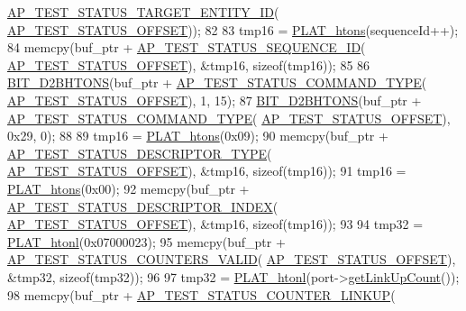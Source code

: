 \begin{DoxyCode}
      \hyperlink{avbap__message_8hpp_a8f4212cffc6a9c484b6b90704ddba6cb}{AP\_TEST\_STATUS\_TARGET\_ENTITY\_ID}(
      \hyperlink{avbap__message_8hpp_a098685900cab07ec2886722ea6b6b85e}{AP\_TEST\_STATUS\_OFFSET}));
82 
83     tmp16 = \hyperlink{linux_2src_2platform_8cpp_aa89fc0aa7465274c200da69771d2a043}{PLAT\_htons}(sequenceId++);
84     memcpy(buf\_ptr + \hyperlink{avbap__message_8hpp_aaee7cec337f736992d787347451d699d}{AP\_TEST\_STATUS\_SEQUENCE\_ID}(
      \hyperlink{avbap__message_8hpp_a098685900cab07ec2886722ea6b6b85e}{AP\_TEST\_STATUS\_OFFSET}), &tmp16, \textcolor{keyword}{sizeof}(tmp16));
85 
86     \hyperlink{ap__message_8cpp_a320aa3b496f6b0356f37f1f09edb0734}{BIT\_D2BHTONS}(buf\_ptr + \hyperlink{avbap__message_8hpp_a6b2762dd2f9be69504f2c7b69377fdf8}{AP\_TEST\_STATUS\_COMMAND\_TYPE}(
      \hyperlink{avbap__message_8hpp_a098685900cab07ec2886722ea6b6b85e}{AP\_TEST\_STATUS\_OFFSET}), 1, 15);
87     \hyperlink{ap__message_8cpp_a320aa3b496f6b0356f37f1f09edb0734}{BIT\_D2BHTONS}(buf\_ptr + \hyperlink{avbap__message_8hpp_a6b2762dd2f9be69504f2c7b69377fdf8}{AP\_TEST\_STATUS\_COMMAND\_TYPE}(
      \hyperlink{avbap__message_8hpp_a098685900cab07ec2886722ea6b6b85e}{AP\_TEST\_STATUS\_OFFSET}), 0x29, 0);
88 
89     tmp16 = \hyperlink{linux_2src_2platform_8cpp_aa89fc0aa7465274c200da69771d2a043}{PLAT\_htons}(0x09);
90     memcpy(buf\_ptr + \hyperlink{avbap__message_8hpp_a6a15470554685a700a1077b84847719a}{AP\_TEST\_STATUS\_DESCRIPTOR\_TYPE}(
      \hyperlink{avbap__message_8hpp_a098685900cab07ec2886722ea6b6b85e}{AP\_TEST\_STATUS\_OFFSET}), &tmp16, \textcolor{keyword}{sizeof}(tmp16));
91     tmp16 = \hyperlink{linux_2src_2platform_8cpp_aa89fc0aa7465274c200da69771d2a043}{PLAT\_htons}(0x00);
92     memcpy(buf\_ptr + \hyperlink{avbap__message_8hpp_adebb11877b5fc03037bc30c6576db78f}{AP\_TEST\_STATUS\_DESCRIPTOR\_INDEX}(
      \hyperlink{avbap__message_8hpp_a098685900cab07ec2886722ea6b6b85e}{AP\_TEST\_STATUS\_OFFSET}), &tmp16, \textcolor{keyword}{sizeof}(tmp16));
93 
94     tmp32 = \hyperlink{linux_2src_2platform_8cpp_a8bf9e45ac3e41441f0e139139241c19d}{PLAT\_htonl}(0x07000023);
95     memcpy(buf\_ptr + \hyperlink{avbap__message_8hpp_a3c7047d2eb405c844004ec4ed3becba1}{AP\_TEST\_STATUS\_COUNTERS\_VALID}(
      \hyperlink{avbap__message_8hpp_a098685900cab07ec2886722ea6b6b85e}{AP\_TEST\_STATUS\_OFFSET}), &tmp32, \textcolor{keyword}{sizeof}(tmp32));
96 
97     tmp32 = \hyperlink{linux_2src_2platform_8cpp_a8bf9e45ac3e41441f0e139139241c19d}{PLAT\_htonl}(port->\hyperlink{class_ether_port_a0a5fca61b7009f358124a07b04d77534}{getLinkUpCount}());
98     memcpy(buf\_ptr + \hyperlink{avbap__message_8hpp_af4ead729ba317bc829a386c51d6dc733}{AP\_TEST\_STATUS\_COUNTER\_LINKUP}(

\end{DoxyCode}

